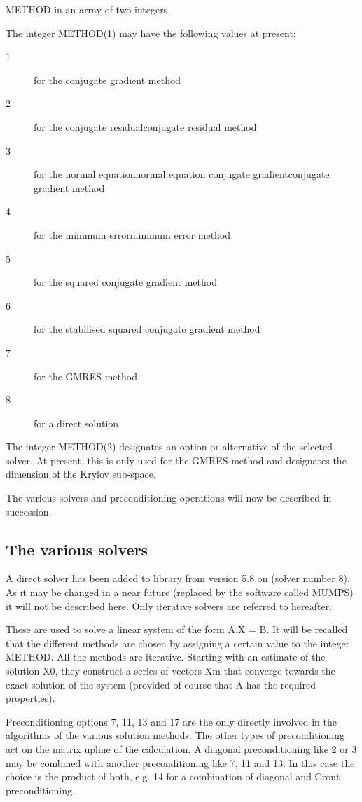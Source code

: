 METHOD in an array of two integers.

The integer METHOD(1) may have the following values at present:
\begin{description}
  \item [1] for the conjugate gradient method
  \item [2] for the conjugate residualconjugate residual method
  \item [3] for the normal equationnormal equation conjugate gradientconjugate
    gradient method
  \item [4] for the minimum errorminimum error method
  \item [5] for the squared conjugate gradient method
  \item [6] for the stabilised squared conjugate gradient
    method
  \item [7] for the GMRES method
  \item [8] for a direct solution
\end{description}

The integer METHOD(2) designates an option or alternative of the selected
solver. At present, this is only used for the GMRES method and designates the
dimension of the Krylov sub-space.

The various solvers and preconditioning operations will now be described in
succession.

\subsection{The various solvers}

A direct solver has been added to library \bief from version 5.8 on (solver
number 8). As it may be changed in a near future (replaced by the software
called MUMPS) it will not be described here. Only iterative solvers are
referred to hereafter.

These are used to solve a linear system of the form A.X = B. It will be
recalled that the different methods are chosen by assigning a certain value to
the integer METHOD. All the  methods are iterative. Starting with an estimate
of the solution X0, they construct a series of vectors Xm that converge towards
the exact solution of the system (provided of course that A has the required
properties).

Preconditioning options 7, 11, 13 and 17 are the only directly involved in the
algorithms of the various solution methods. The other types of preconditioning
act on the matrix upline of the calculation. A diagonal preconditioning like 2
or 3 may be combined with another preconditioning like 7, 11 and 13. In this
case the choice is the product of both, e.g. 14 for a combination of diagonal
and Crout preconditioning.

